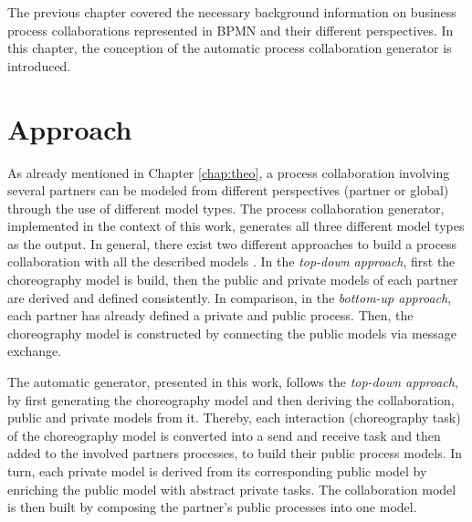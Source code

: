 \renewcommand{\lstlistingname}{Example}

The previous chapter covered the necessary background information on business process collaborations represented in BPMN and their different perspectives. In this chapter, the conception of the automatic process collaboration generator is introduced.

\section{Approach}

As already mentioned in Chapter \ref{chap:theo}, a process collaboration involving several partners can be modeled from different perspectives (partner or global) through the use of different model types. The process collaboration generator, implemented in the context of this work, generates all three different model types as the output. In general, there exist two different approaches to build a process collaboration with all the described models \cite{sabrina1174}. In the \textit{top-down approach}, first the choreography model is build, then the public and private models of each partner are derived and defined consistently. In comparison, in the \textit{bottom-up approach}, each partner has already defined a private and public process. Then, the choreography model is constructed by connecting the public models via message exchange. \par
The automatic generator, presented in this work, follows the \textit{top-down approach}, by first generating the choreography model and then deriving the collaboration, public and private models from it. Thereby, each interaction (choreography task) of the choreography model is converted into a send and receive task and then added to the involved partners processes, to build their public process models. In turn, each private model is derived from its corresponding public model by enriching the public model with abstract private tasks. The collaboration model is then built by composing the partner's public processes into one model.\\

